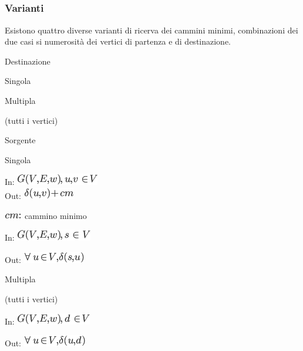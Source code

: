 \documentclass{article}
\begin{document}
\subsection{\texorpdfstring{{}}{}}\label{h.h641h77p7srj}

\subsubsection{\texorpdfstring{{Varianti}}{Varianti}}\label{h.39wfvuocrt5u}

{Esistono quattro diverse varianti di ricerva dei cammini minimi,
combinazioni dei due casi si numerosità dei vertici di partenza e di
destinazione.}

\protect\hypertarget{t.249d86aca9d964d15cac3725f6a7ace85a3425b4}{}{}\protect\hypertarget{t.45}{}{}

{Destinazione}

{Singola}

{Multipla}

{(tutti i vertici)}

{Sorgente}

{Singola}

{In: }\includegraphics{images/image498.png}{\\
Out: }\includegraphics{images/image499.png}

\includegraphics{images/image500.png}{~cammino minimo}

{In: }\includegraphics{images/image501.png}

{Out: }\includegraphics{images/image502.png}

{Multipla}

{(tutti i vertici)}

{In: }\includegraphics{images/image503.png}

{Out: }\includegraphics{images/image504.png}
\end{document}
